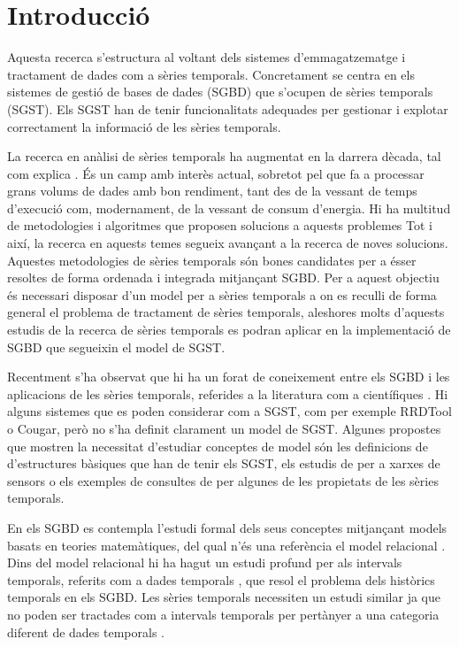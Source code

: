 \chapter{Introducció}


Aquesta recerca s'estructura al voltant dels sistemes d'emmagatzematge
i tractament de dades com a sèries temporals.  Concretament se centra
en els sistemes de gestió de bases de dades (SGBD) que s'ocupen de
sèries temporals (SGST). Els SGST han de tenir funcionalitats
adequades per gestionar i explotar correctament la informació de les
sèries temporals.

La recerca en anàlisi de sèries temporals ha augmentat en la darrera
dècada, tal com explica \textcite{fu11}. És un camp amb interès
actual, sobretot pel que fa a processar grans volums de dades amb bon
rendiment, tant des de la vessant de temps d'execució com,
modernament, de la vessant de consum d'energia. Hi ha multitud de
metodologies i algoritmes que proposen solucions a aquests problemes
Tot i així, la recerca en aquests temes segueix avançant a la recerca
de noves solucions. Aquestes metodologies de sèries temporals són
bones candidates per a ésser resoltes de forma ordenada i integrada
mitjançant SGBD. Per a aquest objectiu és necessari disposar d'un
model per a sèries temporals a on es reculli de forma general el
problema de tractament de sèries temporals, aleshores molts d'aquests
estudis de la recerca de sèries temporals es podran aplicar en la
implementació de SGBD que segueixin el model de SGST.


Recentment s'ha observat que hi ha un forat de coneixement entre els
SGBD i les aplicacions de les sèries temporals, referides a la
literatura com a científiques \parencite{stonebraker09:scidb,zhang11}.
Hi alguns sistemes que es poden considerar com a SGST, com per exemple
RRDTool o Cougar, però no s'ha definit clarament un model de SGST.
Algunes propostes que mostren la necessitat d'estudiar conceptes de
model són les definicions de \textcite{dreyer94} d'estructures
bàsiques que han de tenir els SGST, els estudis de \textcite{bonnet01}
per a xarxes de sensors o els exemples de consultes de
\textcite{zhang11} per algunes de les propietats de les sèries
temporals.

En els SGBD es contempla l'estudi formal dels seus conceptes
mitjançant models basats en teories matemàtiques, del qual n'és una
referència el model relacional \parencite{date:introduction}.  Dins
del model relacional hi ha hagut un estudi profund per als intervals
temporals, referits com a dades
temporals \parencite{date02:_tempor_data_relat_model}, que resol el
problema dels històrics temporals en els SGBD. Les sèries temporals
necessiten un estudi similar ja que no poden ser tractades com a
intervals temporals per pertànyer a una categoria diferent de dades
temporals \parencite{assfalg08:thesis,schmidt95}.













